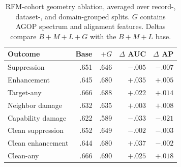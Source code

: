 \begin{table}[t]
\centering
\small
\caption{RFM-cohort geometry ablation, averaged over record-, dataset-, and
domain-grouped splits. $G$ contains AGOP spectrum and alignment features.
Deltas compare $B+M+L+G$ with the $B+M+L$ base.}
\label{tab:geometry-ablation}
\begin{tabular}{lrrrr}
\toprule
Outcome & Base & $+G$ & $\Delta$ AUC & $\Delta$ AP \\
\midrule
Suppression & .651 & .646 & $-.005$ & $-.007$ \\
Enhancement & .645 & .680 & $+.035$ & $+.005$ \\
Target-any & .666 & .688 & $+.022$ & $+.014$ \\
Neighbor damage & .632 & .635 & $+.003$ & $+.008$ \\
Capability damage & .622 & .589 & $-.033$ & $-.021$ \\
Clean suppression & .652 & .649 & $-.002$ & $-.003$ \\
Clean enhancement & .644 & .680 & $+.037$ & $-.002$ \\
Clean-any & .666 & .690 & $+.025$ & $+.018$ \\
\bottomrule
\end{tabular}

\end{table}
